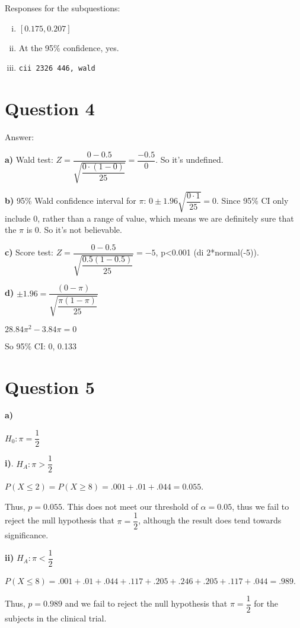 \documentclass{article}
\begin{document}
Responses for the subquestions:

\begin{enumerate}[i.]
    \item $[0.175, 0.207]$
    \item At the 95\% confidence, yes.
    \item \texttt{cii 2326 446, wald}
\end{enumerate}

\section*{Question 4}

Answer:

\textbf{a)}
Wald test: $Z=\dfrac{0-0.5}{\sqrt{\dfrac{0 \cdot (1-0)}{25}}} = \dfrac{-0.5}{0}$. So it's undefined.

\textbf{b)}
95\% Wald confidence interval for $\pi$:
$0 \pm 1.96 \sqrt{\dfrac{0\cdot1}{25}}=0$.
Since 95\% CI only include 0, rather than a range of value, which means we are definitely sure that the $\pi$ is 0. So it's not believable.

\textbf{c)}
Score test:
$Z=\dfrac{0-0.5}{\sqrt{\dfrac{0.5(1-0.5)}{25}}}=-5$, p<0.001 (di 2*normal(-5)).

\textbf{d)}
$\pm 1.96 = \dfrac{(0-\pi)}{\sqrt{\dfrac{\pi(1-\pi)}{25}}}$ \par
$28.84\pi^2-3.84\pi=0$ \par
So 95\% CI: 0, 0.133

\section*{Question 5}

\textbf{a)}

$H_0: \pi = \dfrac{1}{2}$

\textbf{i)}.  $H_A: \pi > \dfrac{1}{2}$

$P(X \leq 2)= P(X \geq 8)= .001 + .01 + .044 = 0.055$.
\newline

Thus, $p=0.055$. This does not meet our threshold of $\alpha = 0.05$, thus we fail to reject the null hypothesis that $\pi = \dfrac{1}{2}$, although the result does tend towards significance.

\textbf{ii)}  $H_A: \pi < \dfrac{1}{2}$

$P(X \leq 8)= .001+.01+.044+.117 +.205 +.246 +.205 +.117 +.044=.989$.

Thus, $p=0.989$ and we fail to reject the null hypothesis that $\pi=\dfrac{1}{2}$ for the subjects in the clinical trial.
\end{document}
